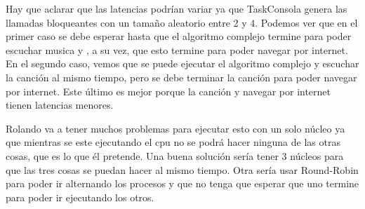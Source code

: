 Hay que aclarar que las latencias podrían variar ya que TaskConsola genera las llamadas bloqueantes con un tamaño aleatorio entre 2 y 4. Podemos ver que en el primer caso se
debe esperar hasta que el algoritmo complejo termine para poder escuchar musica y , a su vez, que esto termine para poder navegar por internet. En el segundo caso, vemos que 
se puede ejecutar el algoritmo complejo y escuchar la canción al mismo tiempo, pero se debe terminar la canción para poder navegar por internet. Este último es mejor porque
la canción y navegar por internet tienen latencias menores. 

Rolando va a tener muchos problemas para ejecutar esto con un solo núcleo ya que mientras se este ejecutando el cpu no se podrá hacer ninguna de las otras cosas, que es lo que él
pretende. Una buena solución sería tener 3 núcleos para que las tres cosas se puedan hacer al mismo tiempo. Otra sería usar Round-Robin para poder ir alternando los procesos y 
que no tenga que esperar que uno termine para poder ir ejecutando los otros.